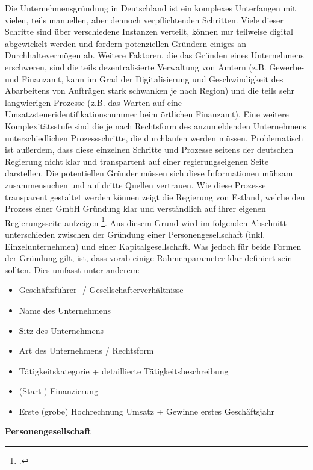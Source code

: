Die Unternehmensgründung in Deutschland ist ein komplexes Unterfangen mit vielen, teils manuellen, aber dennoch verpflichtenden Schritten. Viele dieser Schritte sind über verschiedene Instanzen verteilt, können nur teilweise digital abgewickelt werden und fordern potenziellen Gründern einiges an Durchhaltevermögen ab. Weitere Faktoren, die das Gründen eines Unternehmens erschweren, sind die teils dezentralisierte Verwaltung von Ämtern (z.B. Gewerbe- und Finanzamt, kann im Grad der Digitalisierung und Geschwindigkeit des Abarbeitens von Aufträgen stark schwanken je nach Region) und die teils sehr langwierigen Prozesse (z.B. das Warten auf eine Umsatzsteueridentifikationsnummer beim örtlichen Finanzamt). Eine weitere Komplexitätsstufe sind die je nach Rechtsform des anzumeldenden Unternehmens unterschiedlichen Prozessschritte, die durchlaufen werden müssen. Problematisch ist außerdem, dass diese einzelnen Schritte und Prozesse seitens der deutschen Regierung nicht klar und transpartent auf einer regierungseigenen Seite darstellen. Die potentiellen Gründer müssen sich diese Informationen mühsam zusammensuchen und auf dritte Quellen vertrauen. Wie diese Prozesse transparent gestaltet werden können zeigt die Regierung von Estland, welche den Prozess einer GmbH Gründung klar und verständlich auf ihrer eigenen Regierungsseite aufzeigen \footcite{oa_estland_nodate}.  Aus diesem Grund wird im folgenden Abschnitt unterschieden zwischen der Gründung einer Personengesellschaft (inkl. Einzelunternehmen) und einer Kapitalgesellschaft. Was jedoch für beide Formen der Gründung gilt, ist, dass vorab einige Rahmenparameter klar definiert sein sollten. Dies umfasst unter anderem: 

\begin{itemize}
    \item Geschäftsführer- / Gesellschafterverhältnisse
    \item Name des Unternehmens
    \item Sitz des Unternehmens
    \item Art des Unternehmens / Rechtsform
    \item Tätigkeitskategorie + detaillierte Tätigkeitsbeschreibung
    \item (Start-) Finanzierung
    \item Erste (grobe) Hochrechnung Umsatz + Gewinne erstes Geschäftsjahr
\end{itemize} 

\textbf{Personengesellschaft}

